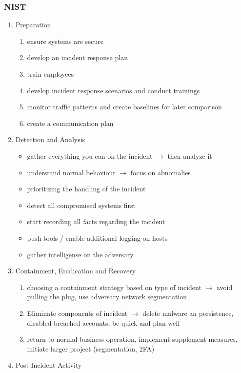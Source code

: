 \subsubsection{NIST}
\begin{enumerate}
    \item Preparation
    \begin{enumerate}
        \item ensure systems are secure
        \item develop an incident response plan
        \item train employees
        \item develop incident response scenarios and conduct trainings
        \item monitor traffic patterns and create baselines for later comparison
        \item create a communication plan
    \end{enumerate}
    \item Detection and Analysis
    \begin{itemize}
        \item gather everything you can on the incident $\rightarrow$ then analyze it
        \item understand normal behaviour $\rightarrow$ focus on abnomalies
        \item prioritizing the handling of the incident
        \item detect all compromised systems first
        \item start recording all facts regarding the incident
        \item push tools / enable additional logging on hosts
        \item gather intelligense on the adversary
    \end{itemize}
    \item Containment, Eradication and Recovery
    \begin{enumerate}
        \item choosing a containment strategy based on type of incident $\rightarrow$ avoid pulling the plug, use adversary network segmentation
        \item Eliminate components of incident $\rightarrow$ delete malware an persistence, disabled breached accounts, be quick and plan well
        \item return to normal business operation, implement supplement measures, initiate larger project (segmentation, 2FA)
    \end{enumerate}
    \item Post Incident Activity
\end{enumerate}

